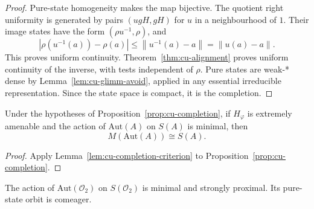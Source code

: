 \begin{proof}
Pure-state homogeneity \cite{KishimotoOzawaSakai2003} makes the map bijective. The quotient
right uniformity is generated by pairs $(ugH,gH)$ for $u$ in a neighbourhood
of $1$. Their image states have the form $(\rho u^{-1},\rho)$, and 
\begin{equation*}
\left|\rho(u^{-1}(a))-\rho(a)\right|
\leq\left\|u^{-1}(a)-a\right\|=\left\|u(a)-a\right\|.
\end{equation*}
This proves uniform continuity. Theorem~\ref{thm:cu-alignment} proves uniform
continuity of the inverse, with tests independent of $\rho$. Pure states are
weak-* dense by Lemma~\ref{lem:cu-glimm-avoid}, applied in any essential
irreducible representation. Since the state space is compact, it is the
completion.
\end{proof}

\begin{corollary}\label{cor:cu-state-criterion}
 Under the hypotheses of Proposition~\ref{prop:cu-completion}, if $H_\varphi$ is extremely amenable and the action of $\mathrm{Aut}(A)$ on $S(A)$ is minimal, then 
\begin{equation*}
M(\mathrm{Aut}(A))\cong S(A).
\end{equation*}
\end{corollary}

\begin{proof}
Apply Lemma~\ref{lem:cu-completion-criterion} to Proposition~\ref{prop:cu-completion}.
\end{proof}

\begin{proposition}\label{prop:cu-minimal}
 The action of $\mathrm{Aut}(\mathcal{O}_2)$ on $S(\mathcal{O}_2)$ is minimal and strongly proximal. Its pure-state orbit is
comeager.
\end{proposition}

